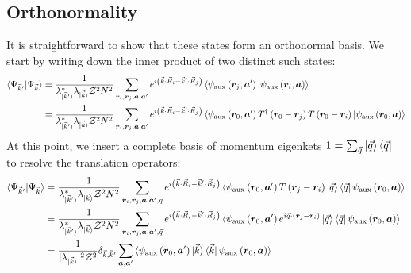 \subsection{Orthonormality}
It is straightforward to show that these states form an orthonormal basis. We start by writing down the inner product of two distinct such states:
\begin{equation}\begin{aligned}
	\braket{\Psi_{\vec k^\prime} | \Psi_{\vec k}} 
	&= \frac{1}{\lambda_{\ket{\vec k^\prime}}^* \lambda_{\ket{\vec k}} \mathcal{Z}^2 N^2}\sum_{{\bm r}_i, {\bm r}_j, {\bm a}, {\bm a}^\prime} e^{i \left(\vec{k}\cdot\vec{R}_i - \vec{k}^\prime\cdot\vec{R}_j\right) } \braket{\psi_\text{aux}\left( {\bm r}_j, {\bm a}^\prime \right) | \psi_\text{aux}\left( {\bm r}_i, {\bm a} \right)} \\
	&= \frac{1}{\lambda_{\ket{\vec k^\prime}}^* \lambda_{\ket{\vec k}} \mathcal{Z}^2 N^2}\sum_{{\bm r}_i, {\bm r}_j, {\bm a}, {\bm a}^\prime} e^{i \left(\vec{k}\cdot\vec{R}_i - \vec{k}^\prime\cdot\vec{R}_j\right) } \braket{\psi_\text{aux}\left( {\bm r_0}, {\bm a}^\prime \right) T^\dagger\left( {\bm r_0} - {\bm r}_j \right) T\left( {\bm r_0} - {\bm r}_i \right) | \psi_\text{aux}\left( {\bm r_0}, {\bm a} \right)}\\
\end{aligned}\end{equation}
At this point, we insert a complete basis of momentum eigenkets \(1 = \sum_{\vec q}\ket{\vec q}\bra{\vec q}\) to resolve the translation operators:
\begin{equation}\begin{aligned}
	\braket{\Psi_{\vec k^\prime} | \Psi_{\vec k}} &= \frac{1}{\lambda_{\ket{\vec k^\prime}}^* \lambda_{\ket{\vec k}} \mathcal{Z}^2 N^2}\sum_{{\bm r}_i, {\bm r}_j, {\bm a}, {\bm a}^\prime, \vec q} e^{i \left(\vec{k}\cdot\vec{R}_i - \vec{k}^\prime\cdot\vec{R}_j\right) } \braket{\psi_\text{aux}\left( {\bm r_0}, {\bm a}^\prime \right) T\left( {\bm r}_j - {\bm r}_i \right) \ket{\vec q}\bra{\vec q} \psi_\text{aux}\left( {\bm r_0}, {\bm a} \right)}\\
						      &= \frac{1}{\lambda_{\ket{\vec k^\prime}}^* \lambda_{\ket{\vec k}} \mathcal{Z}^2 N^2}\sum_{{\bm r}_i, {\bm r}_j, {\bm a}, {\bm a}^\prime, \vec q} e^{i \left(\vec{k}\cdot\vec{R}_i - \vec{k}^\prime\cdot\vec{R}_j\right) } \braket{\psi_\text{aux}\left( {\bm r_0}, {\bm a}^\prime \right) e^{i \vec q \cdot \left( {\bm r}_j - {\bm r}_i \right)} \ket{\vec q}\bra{\vec q} \psi_\text{aux}\left( {\bm r_0}, {\bm a} \right)} \\
						      &= \frac{1}{|\lambda_{\ket{\vec k}}|^2 \mathcal{Z}^2} \delta_{\vec k, \vec k^\prime}\sum_{{\bm a}, {\bm a}^\prime}\braket{\psi_\text{aux}\left( {\bm r_0}, {\bm a}^\prime \right) \ket{\vec k}\bra{\vec k} \psi_\text{aux}\left( {\bm r_0}, {\bm a} \right)}\\
\end{aligned}\end{equation}
